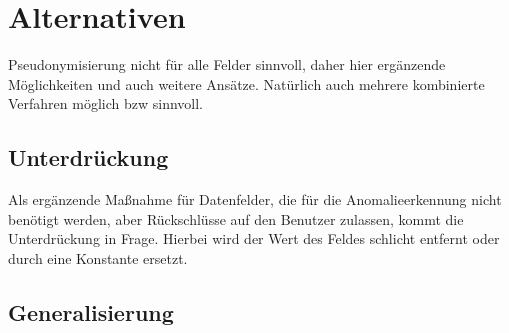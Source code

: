 \chapter{Alternativen}

\label{cha_alternatives}


%

%



Pseudonymisierung nicht für alle Felder sinnvoll, daher hier ergänzende Möglichkeiten und auch weitere Ansätze. 
Natürlich auch mehrere kombinierte Verfahren möglich bzw sinnvoll.



\section{Unterdrückung} %

Als ergänzende Maßnahme für Datenfelder, die für die Anomalieerkennung nicht benötigt werden, aber Rückschlüsse auf den Benutzer zulassen, kommt die Unterdrückung in Frage. Hierbei wird der Wert des Feldes schlicht entfernt oder durch eine Konstante ersetzt. 

\section{Generalisierung}

